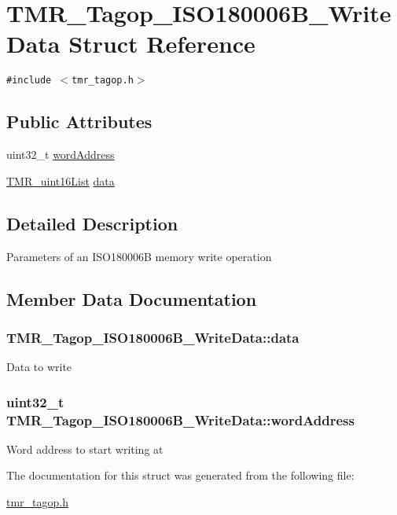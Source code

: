 \hypertarget{struct_t_m_r___tagop___i_s_o180006_b___write_data}{
\section{TMR\_\-Tagop\_\-ISO180006B\_\-WriteData Struct Reference}
\label{struct_t_m_r___tagop___i_s_o180006_b___write_data}
}
{\tt \#include $<$tmr\_\-tagop.h$>$}

\subsection*{Public Attributes}
\begin{CompactItemize}
\item 
uint32\_\-t \hyperlink{struct_t_m_r___tagop___i_s_o180006_b___write_data_376534e4c165892015045deb66159234}{wordAddress}
\item 
\hyperlink{struct_t_m_r__uint16_list}{TMR\_\-uint16List} \hyperlink{struct_t_m_r___tagop___i_s_o180006_b___write_data_47b25588f21fd66d0eda285ffb9e5768}{data}
\end{CompactItemize}


\subsection{Detailed Description}
Parameters of an ISO180006B memory write operation 

\subsection{Member Data Documentation}
\hypertarget{struct_t_m_r___tagop___i_s_o180006_b___write_data_47b25588f21fd66d0eda285ffb9e5768}{
\subsubsection[{data}]{ {\bf TMR\_\-Tagop\_\-ISO180006B\_\-WriteData::data}}}
\label{struct_t_m_r___tagop___i_s_o180006_b___write_data_47b25588f21fd66d0eda285ffb9e5768}


Data to write \hypertarget{struct_t_m_r___tagop___i_s_o180006_b___write_data_376534e4c165892015045deb66159234}{
\subsubsection[{wordAddress}]{\setlength{\rightskip}{0pt plus 5cm}uint32\_\-t {\bf TMR\_\-Tagop\_\-ISO180006B\_\-WriteData::wordAddress}}}
\label{struct_t_m_r___tagop___i_s_o180006_b___write_data_376534e4c165892015045deb66159234}


Word address to start writing at 

The documentation for this struct was generated from the following file:\begin{CompactItemize}
\item 
\hyperlink{tmr__tagop_8h}{tmr\_\-tagop.h}\end{CompactItemize}
